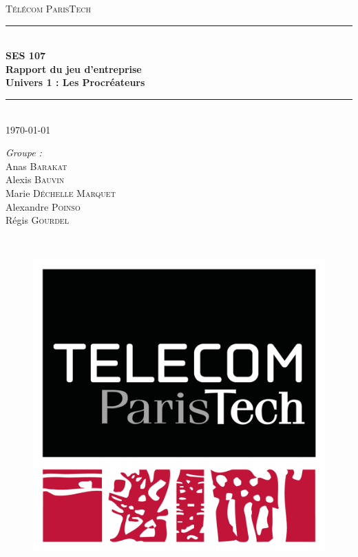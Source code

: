 \documentclass[a4paper,11pt]{article}
\theoremstyle{remark}
\begin{document}
\renewcommand{\contentsname}{Sommaire}
\setcounter{tocdepth}{1}



\begin{titlepage}
	\newcommand{\HRule}{\rule{\linewidth}{0.5mm}}

	\center

	\textsc{\LARGE Télécom ParisTech}\\[1.2cm]

	\HRule \\[0.8cm]
	{ \huge \bfseries SES 107}\\[0.4cm]
	{ \huge \bfseries Rapport du jeu d'entreprise}\\[0.4cm]
	{ \huge \bfseries Univers 1 : Les Procréateurs}\\[0.4cm]
	\HRule \\[1.4cm]
	
	{\large \today}\\[1.5cm]

	\begin{minipage}{0.4\textwidth}
	\large
	\emph{Groupe :}\\
	Anas \textsc{Barakat}\\
	Alexis \textsc{Bauvin}\\
	Marie \textsc{Déchelle Marquet}\\
	Alexandre \textsc{Poinso}\\
	Régis \textsc{Gourdel} \\
	\end{minipage}~\hspace{9.5cm}
	
	\vspace{1.2cm}

	\tableofcontents

	\vspace{2.5cm}

	\begin{figure}[htp]
	\centering
	\includegraphics[scale=0.11]{./logoTelecom.png}
	\end{figure}



\end{titlepage}
\end{document}
